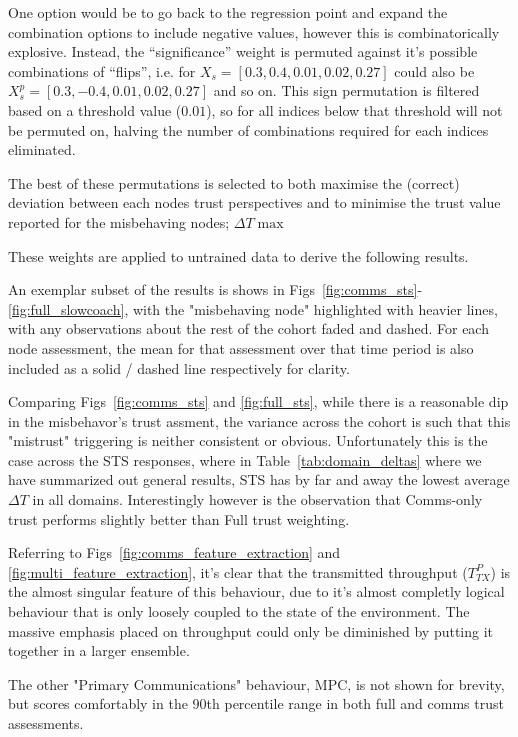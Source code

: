 One option would be to go back to the regression point and expand the combination options to include negative values, however this is combinatorically explosive.
Instead, the ``significance'' weight is permuted against it's possible combinations of ``flips'', i.e. for $X_s=[0.3,0.4,0.01,0.02,0.27]$ could also be $X_s^p=[0.3,-0.4,0.01,0.02,0.27]$ and so on. 
This sign permutation is filtered based on a threshold value ($0.01$), so for all indices below that threshold will not be permuted on, halving the number of combinations required for each indices eliminated.

The best of these permutations is selected to both maximise the (correct) deviation between each nodes trust perspectives and to minimise the trust value reported for the misbehaving nodes; $\Delta T \max$

These weights are applied to untrained data to derive the following results.

An exemplar subset of the results is shows in Figs~\ref{fig:comms_sts}-\ref{fig:full_slowcoach}, with the "misbehaving node" highlighted with heavier lines, with any observations about the rest of the cohort faded and dashed. For each node assessment, the mean for that assessment over that time period is also included as a solid / dashed line respectively for clarity.

Comparing Figs~\ref{fig:comms_sts} and \ref{fig:full_sts}, while there is a reasonable dip in the misbehavor's trust assment, the variance across the cohort is such that this "mistrust" triggering is neither consistent or obvious. Unfortunately this is the case across the STS responses, where in Table~\ref{tab:domain_deltas} where we have summarized out general results, STS has by far and away the lowest average $\Delta T$ in all domains. Interestingly however is the observation that Comms-only trust performs slightly better than Full trust weighting.

Referring to Figs~\ref{fig:comms_feature_extraction} and \ref{fig:multi_feature_extraction}, it's clear that the transmitted throughput ($T^P_{TX}$) is the almost singular feature of this behaviour, due to it's almost completly logical behaviour that is only loosely coupled to the state of the environment. 
The massive emphasis placed on throughput could only be diminished by putting it together in a larger ensemble.

The other "Primary Communications" behaviour, MPC, is not shown for brevity, but scores comfortably in the 90th percentile range in both full and comms trust assessments.

